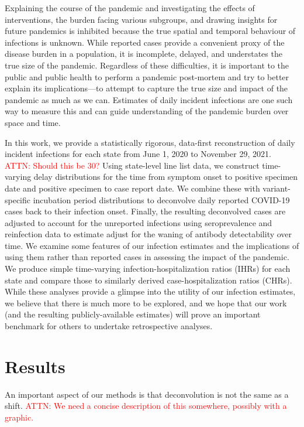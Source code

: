 \documentclass{article}
\newcommand{\attn }[1]{\textcolor{red}{ATTN: #1}}
\begin{document}
Explaining the course of the pandemic and investigating the effects of
interventions, the burden facing various subgroups, and drawing insights for
future pandemics is inhibited because the true spatial and temporal behaviour of
infections is unknown. While reported cases provide a convenient proxy of the
disease burden in a population, it is incomplete, delayed, and understates the
true size of the pandemic. Regardless of these difficulties, it is important to
the public and public health to perform a pandemic post-mortem and try to better
explain its implications---to attempt to capture the true size and impact of the
pandemic as much as we can. Estimates of daily incident infections are one such
way to measure this and can guide understanding of the pandemic burden over
space and time.

In this work, we provide a statistically rigorous, data-first reconstruction of
daily incident infections for each \US state from June 1, 2020 to November 29, 2021.
\attn{Should this be 30?}
Using state-level line list data, we construct time-varying delay distributions
for the time from symptom onset to positive specimen date and positive specimen
to case report date. We combine these with variant-specific incubation period
distributions to deconvolve daily reported COVID-19 cases back to their
infection onset. Finally, the resulting deconvolved cases are adjusted to
account for the unreported infections using seroprevalence and reinfection data
to estimate adjust for the waning of antibody detectability over time. We
examine some features of our infection estimates and the implications of using
them rather than reported cases in assessing the impact of the pandemic. We
produce simple time-varying infection-hospitalization ratios (IHRs) for each
state and compare those to similarly derived case-hospitalization ratios (CHRs).
While these analyses provide a glimpse into the utility of our infection
estimates, we believe that there is much more to be explored, and we hope that
our work (and the resulting publicly-available estimates) will prove an
important benchmark for others to undertake retrospective analyses.




\section{Results}
\label{sec:results}

An important aspect of our methods is that deconvolution is not the same as a
shift. \attn{We need a concise description of this somewhere, possibly with a
graphic.}
\end{document}
